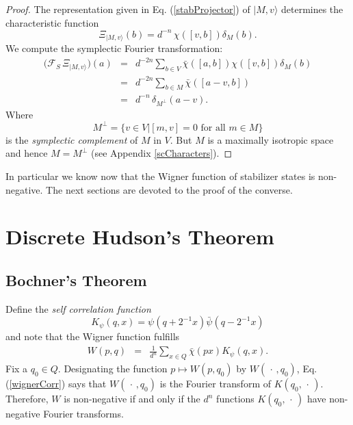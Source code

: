 \documentclass[aps,twocolumn,floatfix]{revtex4}
\def\ket#1.{|#1\rangle}
\def\Fou{\mathcal{F}}
\def\spacedot{\,\cdot\,}
\begin{document}
\begin{proof}
	The representation given in Eq. (\ref{stabProjector}) of $\ket M,v.$
	determines the characteristic function
	\begin{equation*}
		\Xi_{\ket M,v.}(b) = d^{-n}\,\chi([v,b]) \delta_M(b).
	\end{equation*}
	We compute the symplectic Fourier transformation:
	\begin{eqnarray*}
		\big(\Fou_S\,\Xi_{\ket M,v.}\big)(a)
		&=& d^{-2n} \sum_{b\in V} \bar\chi([a,b])\chi([v,b])\delta_M(b) \\
		&=& d^{-2n} \sum_{b\in M} \bar\chi([a-v,b]) \\
		&=& d^{-n}\, \delta_{M^\bot}(a-v).
	\end{eqnarray*}
	Where 
	\begin{equation*} 
		M^\bot=\{v\in V|[m,v]=0 \text{ for all } m\in M\} 
	\end{equation*} 
	is the \emph{symplectic complement} of $M$ in $V$. But $M$ is a
	maximally isotropic space and hence $M=M^\bot$ (see Appendix
	\ref{scCharacters}).
\end{proof}

In particular we know now that the Wigner function of stabilizer
states is non-negative. The next sections are devoted to the proof of
the converse. 

\section{Discrete Hudson's Theorem}
\label{scMain}

\subsection{Bochner's Theorem}

Define the \emph{self correlation function} 
\begin{equation*}
	K_\psi(q,x)=\psi(q+2^{-1}x) \bar\psi(q-2^{-1}x)
\end{equation*}
and note that the Wigner function fulfills
\begin{eqnarray}\label{wignerCorr}
	W(p,q)
	&=&\frac1{d^n} \sum_{x\in Q} \bar\chi(p x) K_\psi(q,x).
\end{eqnarray}
Fix a $q_0\in Q$. Designating the function $p\mapsto W(p,q_0)$ by
$W(\spacedot,q_0)$, Eq. (\ref{wignerCorr}) says that $W(\spacedot,q_0)$ is
the Fourier transform of $K(q_0,\spacedot)$.  Therefore, $W$ is
non-negative if and only if the $d^n$ functions $K(q_0,\spacedot)$ have
non-negative Fourier transforms.
\end{document}
